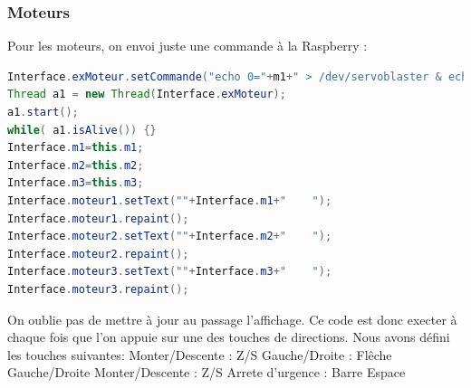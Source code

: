 \documentclass[a4paper,11pt]{report}
\begin{document}
		\subsubsection{Moteurs}
		Pour les moteurs, on envoi juste une commande à la Raspberry :
		\begin{lstlisting}[language=java]
Interface.exMoteur.setCommande("echo 0="+m1+" > /dev/servoblaster & echo 1="+m2+" > /dev/servoblaster & echo 2="+m3+" > /dev/servoblaster");
Thread a1 = new Thread(Interface.exMoteur);
a1.start();
while( a1.isAlive()) {}
Interface.m1=this.m1;
Interface.m2=this.m2;
Interface.m3=this.m3;
Interface.moteur1.setText(""+Interface.m1+"    ");
Interface.moteur1.repaint();
Interface.moteur2.setText(""+Interface.m2+"    ");
Interface.moteur2.repaint();
Interface.moteur3.setText(""+Interface.m3+"    ");
Interface.moteur3.repaint();
		\end{lstlisting}
		On oublie pas de mettre à jour au passage l'affichage.
		\newline Ce code est donc execter à chaque fois que l'on appuie sur une des touches de directions.
		\newline Nous avons défini les touches suivantes:
		\newline Monter/Descente : Z/S
		\newline Gauche/Droite : Flêche Gauche/Droite
		\newline Monter/Descente : Z/S
		\newline Arrete d'urgence : Barre Espace
		
\end{document}

